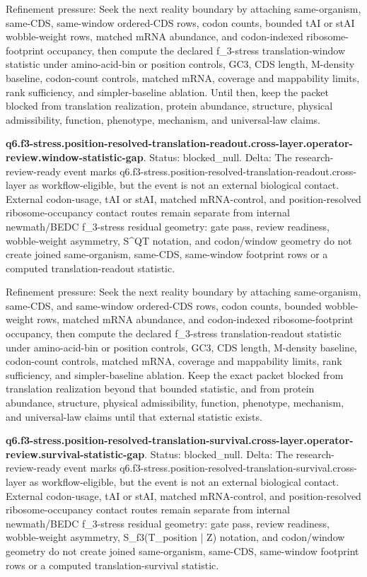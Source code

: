 Refinement pressure: Seek the next reality boundary by attaching same-organism, same-CDS, same-window ordered-CDS rows, codon counts, bounded tAI or stAI wobble-weight rows, matched mRNA abundance, and codon-indexed ribosome-footprint occupancy, then compute the declared f\_3-stress translation-window statistic under amino-acid-bin or position controls, GC3, CDS length, M-density baseline, codon-count controls, matched mRNA, coverage and mappability limits, rank sufficiency, and simpler-baseline ablation. Until then, keep the packet blocked from translation realization, protein abundance, structure, physical admissibility, function, phenotype, mechanism, and universal-law claims.

\textbf{q6.f3-stress.position-resolved-translation-readout.cross-layer.operator-review.window-statistic-gap}. Status: blocked\_null. Delta: The research-review-ready event marks q6.f3-stress.position-resolved-translation-readout.cross-layer as workflow-eligible, but the event is not an external biological contact. External codon-usage, tAI or stAI, matched mRNA-control, and position-resolved ribosome-occupancy contact routes remain separate from internal newmath/BEDC f\_3-stress residual geometry: gate pass, review readiness, wobble-weight asymmetry, S\textasciicircum{}QT notation, and codon/window geometry do not create joined same-organism, same-CDS, same-window footprint rows or a computed translation-readout statistic.

Refinement pressure: Seek the next reality boundary by attaching same-organism, same-CDS, and same-window ordered-CDS rows, codon counts, bounded wobble-weight rows, matched mRNA abundance, and codon-indexed ribosome-footprint occupancy, then compute the declared f\_3-stress translation-readout statistic under amino-acid-bin or position controls, GC3, CDS length, M-density baseline, codon-count controls, matched mRNA, coverage and mappability limits, rank sufficiency, and simpler-baseline ablation. Keep the exact packet blocked from translation realization beyond that bounded statistic, and from protein abundance, structure, physical admissibility, function, phenotype, mechanism, and universal-law claims until that external statistic exists.

\textbf{q6.f3-stress.position-resolved-translation-survival.cross-layer.operator-review.survival-statistic-gap}. Status: blocked\_null. Delta: The research-review-ready event marks q6.f3-stress.position-resolved-translation-survival.cross-layer as workflow-eligible, but the event is not an external biological contact. External codon-usage, tAI or stAI, matched mRNA-control, and position-resolved ribosome-occupancy contact routes remain separate from internal newmath/BEDC f\_3-stress residual geometry: gate pass, review readiness, wobble-weight asymmetry, S\_f3(T\_position | Z) notation, and codon/window geometry do not create joined same-organism, same-CDS, same-window footprint rows or a computed translation-survival statistic.

